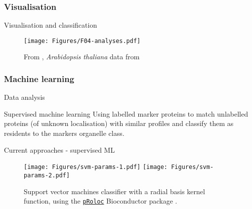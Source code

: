 \subsubsection*{Visualisation}
\label{sec:viz}

\begin{frame}{Visualisation and classification}
  \begin{figure}
    \centering
    \texttt{[image: Figures/F04-analyses.pdf]}
    \caption{From \cite{Gatto:2010}, \textit{Arabidopsis thaliana} data
      from \cite{Dunkley:2006}}
  \end{figure}   
\end{frame}

\subsubsection*{Machine learning}
\label{sec:ml}

\begin{frame}{Data analysis}
  \begin{centering}

    \begin{block}{Supervised machine learning}    
      Using labelled marker proteins to match unlabelled proteins (of
      unknown localisation) with similar profiles and classify them as
      residents to the markers organelle class.
    \end{block}
  \end{centering}
\end{frame}


\begin{frame}{Current approaches - supervised ML}
  \begin{figure}[h]
    \centering 
    \texttt{[image: Figures/svm-params-1.pdf]}
    \texttt{[image: Figures/svm-params-2.pdf]}    
    \caption{Support vector machines classifier with a radial basis
      kernel function, using the
      \href{http://bioconductor.org/packages/release/bioc/html/pRoloc.html}{\texttt{pRoloc}}
      Bioconductor package \citep{Gatto:2014}.}
  \end{figure}
\end{frame}



